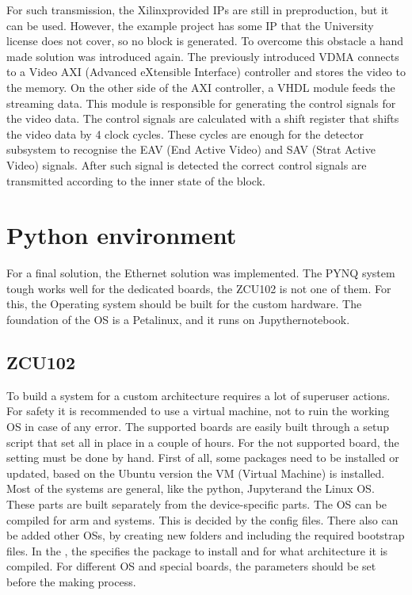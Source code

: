 For such transmission, the Xilinx\texttrademark provided IPs are still in preproduction, but it can be used.
However, the example project has some IP that the University license does not cover, so no block is generated.
To overcome this obstacle a hand made solution was introduced again.
The previously introduced VDMA connects to a Video AXI (Advanced eXtensible Interface) controller and stores the video to the memory.
On the other side of the AXI controller, a VHDL module feeds the streaming data.
This module is responsible for generating the control signals for the video data.
The control signals are calculated with a shift register that shifts the video data by 4 clock cycles.
These cycles are enough for the detector subsystem to recognise the EAV (End Active Video) and SAV (Strat Active Video) signals.
After such signal is detected the correct control signals are transmitted according to the inner state of the block.

\section{Python environment} %
For a final solution, the Ethernet solution was implemented.
The PYNQ system tough works well for the dedicated boards, the ZCU102 is not one of them.
For this, the Operating system should be built for the custom hardware.
The foundation of the OS is a Petalinux\texttrademark, and it runs on Jupyther\texttrademark notebook.

\subsection{ZCU102} %
To build a system for a custom architecture requires a lot of superuser actions.
For safety it is recommended to use a virtual machine, not to ruin the working OS in case of any error.
The supported boards are easily built through a setup script that set all in place in a couple of hours.
For the not supported board, the setting must be done by hand.
First of all, some packages need to be installed or updated, based on the Ubuntu version the VM (Virtual Machine) is installed.
Most of the systems are general, like the python, Jupyter\texttrademark and the Linux OS.
These parts are built separately from the device-specific parts.
The OS can be compiled for arm and  systems.
This is decided by the config files.
There also can be added other OSs, by creating new folders and including the required bootstrap files.
In the  , the  specifies the package to install and for what architecture it is compiled.
For different OS and special boards, the parameters should be set before the making process.

